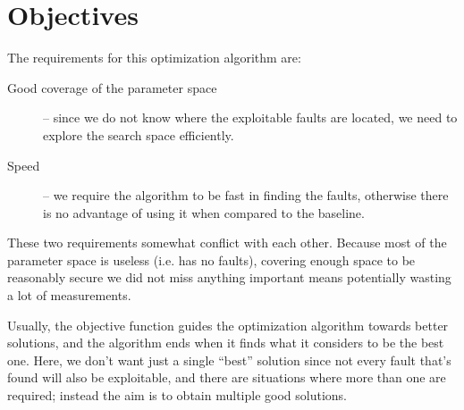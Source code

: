\documentclass[times, utf8, diplomski]{fer}
\begin{document}


\section{Objectives}\label{sec:objectives}
The requirements for this optimization algorithm are:
\begin{description}
    \item[Good coverage of the parameter space] -- since we do not know where the
          exploitable faults are located, we need to explore the search space efficiently.
    \item[Speed] -- we require the algorithm to be fast in finding the faults, otherwise
          there is no advantage of using it when compared to the baseline.
\end{description}

These two requirements somewhat conflict with each other. Because most of the
parameter space is useless (i.e. has no faults), covering enough space to be
reasonably secure we did not miss anything important means potentially wasting
a lot of measurements.

Usually, the objective function guides the optimization algorithm towards better
solutions, and the algorithm ends when it finds what it considers to be the best
one. Here, we don't want just a single ``best'' solution since not every fault
that's found will also be exploitable, and there are situations where more than
one are required; instead the aim is to obtain multiple good solutions.
\end{document}
